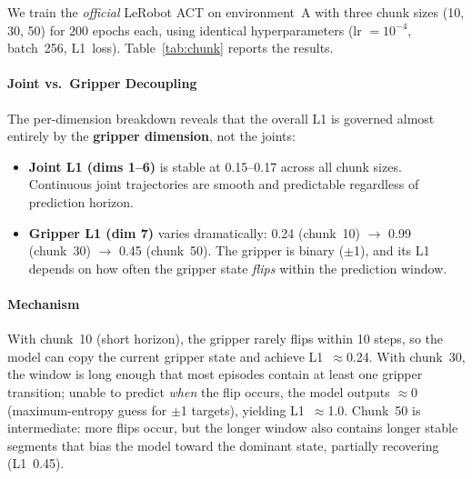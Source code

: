 \documentclass[10pt,twocolumn,letterpaper]{article}
\begin{document}
We train the \emph{official} LeRobot ACT on environment~A with three chunk sizes (10, 30, 50) for 200 epochs each, using identical hyperparameters (lr $= 10^{-4}$, batch~256, L1~loss). Table~\ref{tab:chunk} reports the results.

\begin{table}[h]
\centering
\caption{Action chunking robustness: official ACT on env~A, evaluated zero-shot on env~D. Train Loss is total (action L1 + KL$\times$10); per-dimension L1 is from post-hoc evaluation.}
\label{tab:chunk}
\end{table}

\paragraph{Joint vs.\ Gripper Decoupling} The per-dimension breakdown reveals that the overall L1 is governed almost entirely by the \textbf{gripper dimension}, not the joints:

\begin{itemize}
\item \textbf{Joint L1 (dims 1--6)} is stable at 0.15--0.17 across all chunk sizes. Continuous joint trajectories are smooth and predictable regardless of prediction horizon.
\item \textbf{Gripper L1 (dim 7)} varies dramatically: 0.24 (chunk~10) $\to$ 0.99 (chunk~30) $\to$ 0.45 (chunk~50). The gripper is binary ($\pm$1), and its L1 depends on how often the gripper state \emph{flips} within the prediction window.
\end{itemize}

\paragraph{Mechanism} With chunk~10 (short horizon), the gripper rarely flips within 10 steps, so the model can copy the current gripper state and achieve L1~$\approx$0.24. With chunk~30, the window is long enough that most episodes contain at least one gripper transition; unable to predict \emph{when} the flip occurs, the model outputs $\approx$0 (maximum-entropy guess for $\pm$1 targets), yielding L1~$\approx$1.0. Chunk~50 is intermediate: more flips occur, but the longer window also contains longer stable segments that bias the model toward the dominant state, partially recovering (L1~0.45).
\end{document}
